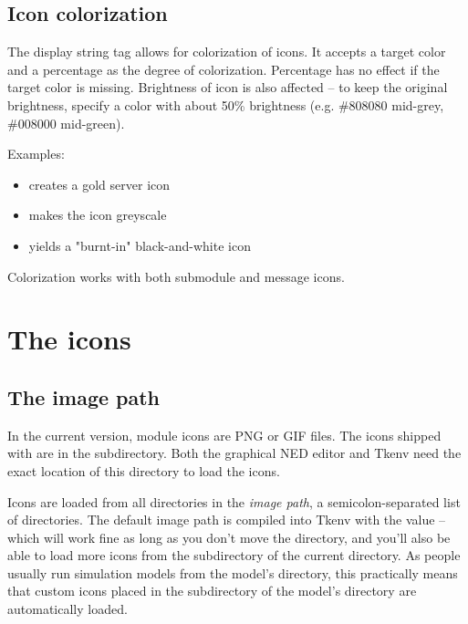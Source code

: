 \subsection{Icon colorization}

The  display string tag allows for colorization of icons.
It accepts a target color and a percentage as the degree of colorization.
Percentage has no effect if the target color is missing.
Brightness of icon is also affected -- to keep the original brightness,
specify a color with about 50\% brightness (e.g. \#808080 mid-grey,
\#008000 mid-green).

Examples:

\begin{itemize}
  \item {} creates a gold server icon
  \item {} makes the icon greyscale
  \item {} yields a "burnt-in" black-and-white icon
\end{itemize}

Colorization works with both submodule and message icons.


\section{The icons}
\label{sec:ch-graphics:icon-library}

\subsection{The image path}

In the current {\opp} version, module icons are PNG or GIF files. The icons shipped
with {\opp} are in the  subdirectory. Both the graphical NED editor
and Tkenv need the exact location of this directory to load the icons.

Icons are loaded from all directories in the \textit{image path},
a semicolon-separated list of directories.
The default image path is compiled into Tkenv with the value
 -- which will work fine
as long as you don't move the directory, and you'll also be able to
load more icons from the  subdirectory of the current
directory. As people usually run simulation models from the model's
directory, this practically means that custom icons placed in the
 subdirectory of the model's directory are automatically
loaded.

